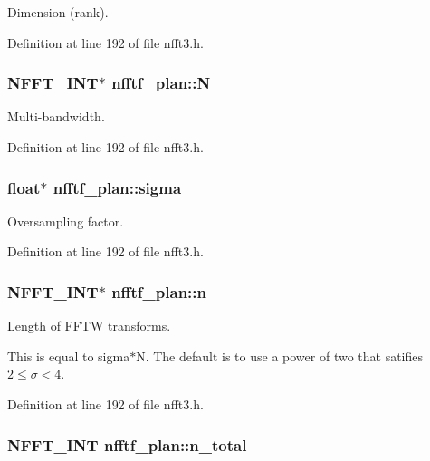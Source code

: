 Dimension (rank). 



Definition at line 192 of file nfft3.\-h.

\hypertarget{structnfftf__plan_a2cbc0f46a4f12f077dd82d6e78bf8e6f}{
\subsubsection[{N}]{\setlength{\rightskip}{0pt plus 5cm}N\-F\-F\-T\-\_\-\-I\-N\-T$\ast$ nfftf\-\_\-plan\-::\-N}}\label{structnfftf__plan_a2cbc0f46a4f12f077dd82d6e78bf8e6f}


Multi-\/bandwidth. 



Definition at line 192 of file nfft3.\-h.

\hypertarget{structnfftf__plan_a20d669812b6acf9a8bda34cb659d61dd}{
\subsubsection[{sigma}]{\setlength{\rightskip}{0pt plus 5cm}float$\ast$ nfftf\-\_\-plan\-::sigma}}\label{structnfftf__plan_a20d669812b6acf9a8bda34cb659d61dd}


Oversampling factor. 



Definition at line 192 of file nfft3.\-h.

\hypertarget{structnfftf__plan_af3d8b5fb6da6564641c613016218c11a}{
\subsubsection[{n}]{\setlength{\rightskip}{0pt plus 5cm}N\-F\-F\-T\-\_\-\-I\-N\-T$\ast$ nfftf\-\_\-plan\-::n}}\label{structnfftf__plan_af3d8b5fb6da6564641c613016218c11a}


Length of F\-F\-T\-W transforms. 

This is equal to sigma$\ast$\-N. The default is to use a power of two that satifies $2\le\sigma<4$. 

Definition at line 192 of file nfft3.\-h.

\hypertarget{structnfftf__plan_a4a8cde81c6ece514d2b36b46aa998842}{
\subsubsection[{n\-\_\-total}]{\setlength{\rightskip}{0pt plus 5cm}N\-F\-F\-T\-\_\-\-I\-N\-T nfftf\-\_\-plan\-::n\-\_\-total}}\label{structnfftf__plan_a4a8cde81c6ece514d2b36b46aa998842}


